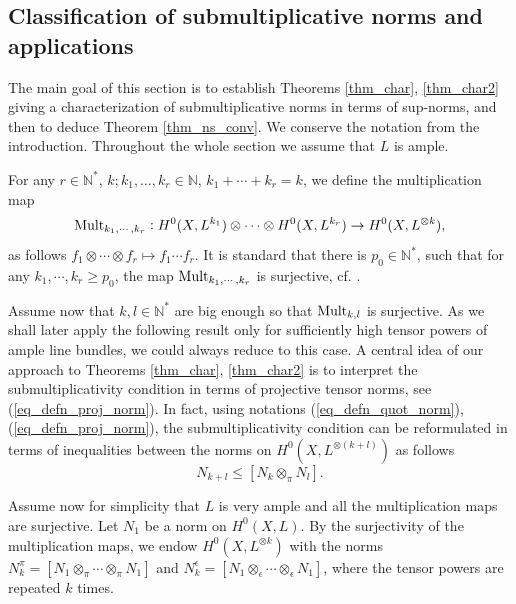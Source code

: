 \documentclass[12pt]{article}
\numberwithin{equation}{section}
\theoremstyle{theorem}
\theoremstyle{definition}
\theoremstyle{remark}
\newcommand{\nat}{\mathbb{N}}
\begin{document}
	\subsection{Classification of submultiplicative norms and applications}\label{sect_subm}
		The main goal of this section is to establish Theorems \ref{thm_char}, \ref{thm_char2} giving a characterization of submultiplicative norms in terms of sup-norms, and then to deduce Theorem \ref{thm_ns_conv}.
		We conserve the notation from the introduction.
		Throughout the whole section we assume that $L$ is ample.
	\par 
	For any $r \in \nat^*$, $k; k_1, \ldots, k_r \in \nat$, $k_1 + \cdots + k_r = k$, we define the multiplication map
	\begin{equation}\label{eq_mult_map}
		{\rm{Mult}}_{k_1, \cdots, k_r} : H^0(X, L^{k_1}) \otimes \cdots \otimes H^0(X, L^{k_r}) 
		\to
		H^0(X, L^{\otimes k}),
	\end{equation}	
	as follows $f_1 \otimes \cdots \otimes f_r \mapsto f_1 \cdots f_r$.
	It is standard that there is $p_0 \in \nat^*$, such that for any $k_1, \cdots, k_r \geq p_0$, the map ${\rm{Mult}}_{k_1, \cdots, k_r}$ is surjective, cf. \cite[Proposition 3.1]{FinSecRing}.
	\par 
	Assume now that $k, l \in \nat^*$ are big enough so that ${\rm{Mult}}_{k, l}$ is surjective.
	As we shall later apply the following result only for sufficiently high tensor powers of ample line bundles, we could always reduce to this case.
	A central idea of our approach to Theorems \ref{thm_char}, \ref{thm_char2} is to interpret the submultiplicativity condition in terms of projective tensor norms, see (\ref{eq_defn_proj_norm}).
	In fact, using notations (\ref{eq_defn_quot_norm}), (\ref{eq_defn_proj_norm}), the submultiplicativity condition can be reformulated in terms of inequalities between the norms on $H^0(X, L^{\otimes (k + l)})$ as follows
	\begin{equation}\label{eq_reform_subm_cond}
		N_{k + l} \leq [N_k \otimes_{\pi} N_l].
	\end{equation}
	\par 
 	Assume now for simplicity that $L$ is very ample and all the multiplication maps are surjective.
 	Let $N_1$ be a norm on $H^0(X, L)$.
 	By the surjectivity of the multiplication maps, we endow $H^0(X, L^{\otimes k})$ with the norms $N_k^{\pi} = [N_1 \otimes_{\pi} \cdots \otimes_{\pi} N_1]$ and $N_k^{\epsilon} = [N_1 \otimes_{\epsilon} \cdots \otimes_{\epsilon} N_1]$, where the tensor powers are repeated $k$ times.
\end{document}
